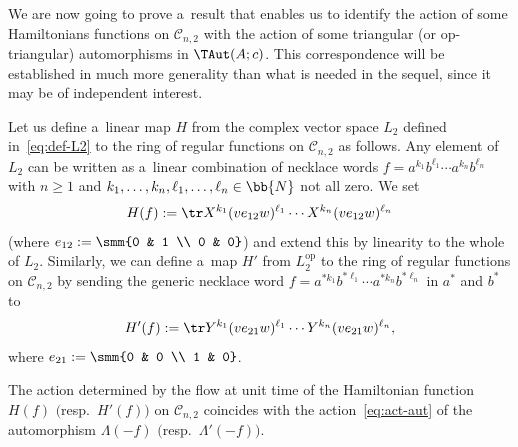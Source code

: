We are now going to prove a~result that enables us to identify the action of some Hamiltonians functions on
\(\mathcal{C}_{n,2}\) with the action of some triangular (or op-triangular) automorphisms in \(\TAut(A;c)\).
This correspondence will be established in much more generality than what is needed in the sequel, since it
may be of independent interest.

Let us def\/ine a~linear map \(H\) from the complex vector space \(L_{2}\) def\/ined in~\eqref{eq:def-L2}
to the ring of regular functions on \(\mathcal{C}_{n,2}\) as follows.
Any element of \(L_{2}\) can be written as a~linear combination of necklace words \(f =
a^{k_{1}}b^{\ell_{1}}\cdots a^{k_{n}}b^{\ell_{n}}\) with \(n\geq 1\) and \(k_{1}, \dots, k_{n}, \ell_{1},
\dots, \ell_{n}\in \bb{N}\) not all zero.
We set
\begin{gather}
\label{eq:def-H}
H(f)\mathrel{:=}\tr X^{k_{1}}(ve_{12}w)^{\ell_{1}}\cdots X^{k_{n}}(ve_{12}w)^{\ell_{n}}
\end{gather}
(where \(e_{12}\mathrel{:=} \smm{0 & 1
\\ %
0 & 0}\)) and extend this by linearity to the whole of \(L_{2}\).
Similarly, we can def\/ine a~map \(H'\) from \(L_{2}^{\mathrm{op}}\) to the ring of regular functions on
\(\mathcal{C}_{n,2}\) by sending the generic necklace word \(f = a^{*k_{1}}b^{*\ell_{1}}\cdots
a^{*k_{n}}b^{*\ell_{n}}\) in \(a^{*}\) and \(b^{*}\) to
\begin{gather}
\label{eq:def-Hp}
H'(f)\mathrel{:=}\tr Y^{k_{1}}(ve_{21}w)^{\ell_{1}}\cdots Y^{k_{n}}(ve_{21}w)^{\ell_{n}},
\end{gather}
where \(e_{21}\mathrel{:=} \smm{0 & 0
\\
1 & 0}\).

\begin{theorem}
\label{teo:flows}
The action determined by the flow at unit time of the Hamiltonian function \(H(f)\) $($resp.\
\(H'(f))\) on \(\mathcal{C}_{n,2}\) coincides with the action~\eqref{eq:act-aut} of the automorphism
\(\Lambda(-f)\) $($resp.\
\(\Lambda'(-f))\).
\end{theorem}

